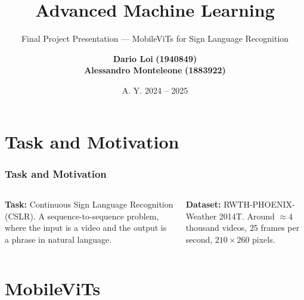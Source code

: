 \documentclass[english, xcolor={table}]{beamer}
\author{\scriptsize \textbf{Dario Loi}  \textbf{(1940849)}  \\ \textbf{Alessandro Monteleone} \textbf{(1883922)}}
\title{Advanced Machine Learning}
\subtitle{Final Project Presentation --- MobileViTs for Sign Language Recognition}
\institute{M.Sc. in Computer Science, \\ Sapienza, University of Rome.}
\date{A. Y. 2024 -- 2025}
\begin{document}
\maketitle

\section{Task and Motivation}

\begin{frame}
  \frametitle{Task and Motivation}

  \begin{columns}
    \begin{column}{0.5\textwidth}
        \textbf{Task:} Continuous Sign Language Recognition (CSLR).
        A \alert{sequence-to-sequence} problem, where the input is a video and the output is a phrase in natural language.
    \end{column}
    \begin{column}{0.5\textwidth}
        \textbf{Dataset:} RWTH-PHOENIX-Weather 2014T.
        Around $\approx 4$ thousand videos, $25$ frames per second, $210 \times 260$ pixels.
      \end{column}
  \end{columns}
\end{frame}

\section{MobileViTs}
\end{document}
